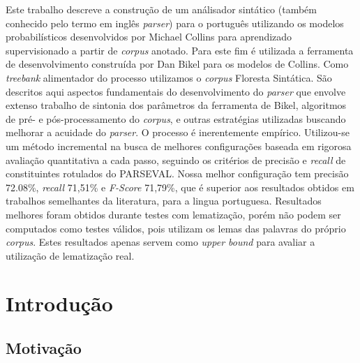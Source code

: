 \documentclass[a4paper]{abnt}
\begin{document}


\pagestyle{plain}


\begin{resumo}
Este trabalho descreve a construção de um análisador sintático (também conhecido pelo termo em inglês \emph{parser}) para o português utilizando os modelos probabilísticos desenvolvidos por Michael Collins para aprendizado supervisionado a partir de \emph{corpus} anotado. 
Para este fim é utilizada a ferramenta de desenvolvimento construída por Dan Bikel para os modelos de Collins. 
Como \emph{treebank} alimentador do processo utilizamos o \emph{corpus} Floresta Sintática.
São descritos aqui aspectos fundamentais do desenvolvimento do \emph{parser} que envolve extenso trabalho de sintonia dos parâmetros da ferramenta de Bikel, algoritmos de pré- e pós-processamento do \emph{corpus}, e outras estratégias utilizadas buscando melhorar a acuidade do \emph{parser}. 
O processo é inerentemente empírico. Utilizou-se um método incremental na busca de melhores configurações baseada em rigorosa avaliação quantitativa a cada passo, seguindo os critérios de precisão e \emph{recall} de constituintes rotulados do PARSEVAL. 
Nossa melhor configuração tem precisão 72.08{\%}, \emph{recall} 71,51{\%} e \emph{F-Score} 71,79{\%}, que é superior aos resultados obtidos em trabalhos semelhantes da literatura, para a lingua portuguesa. Resultados melhores foram obtidos durante testes com lematização, porém não podem ser computados como testes válidos, pois utilizam os lemas das palavras do próprio \emph{corpus}. Estes resultados apenas servem como \emph{upper bound} para avaliar a utilização de lematização real.

\end{resumo}

\tableofcontents
\listoffigures
\listoftables

%


\setcounter{page}{0}

\chapter{Introdução}
\label{cha:introducao}
\thispagestyle{empty}
    

\section{Motivação}
\label{sec:motivacao}
	
\end{document}

